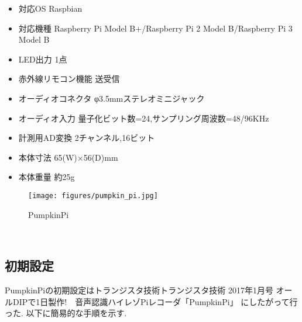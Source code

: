 \begin{itemize}
\tightlist
\item
  対応OS Raspbian
\item
  対応機種 Raspberry Pi Model B+/Raspberry Pi 2 Model B/Raspberry Pi 3
  Model B
\item
  LED出力 1点
\item
  赤外線リモコン機能 送受信
\item
  オーディオコネクタ φ3.5mmステレオミニジャック
\item
  オーディオ入力 量子化ビット数=24,サンプリング周波数=48/96KHz
\item
  計測用AD変換 2チャンネル,16ビット
\item
  本体寸法 65(W)×56(D)mm
\item
  本体重量 約25g
\end{itemize}

\begin{figure}[H]
\centering
\texttt{[image: figures/pumpkin\_pi.jpg]}
\label{fig:pumpkin_pi}
\caption{PumpkinPi}
\end{figure}

\
\subsection{初期設定}\label{adc-setup}

PumpkinPiの初期設定はトランジスタ技術トランジスタ技術
2017年1月号 オールDIPで1日製作!　音声認識ハイレゾPiレコーダ「PumpkinPi」\cite{transistor:online} にしたがって行った. 以下に簡易的な手順を示す. 

